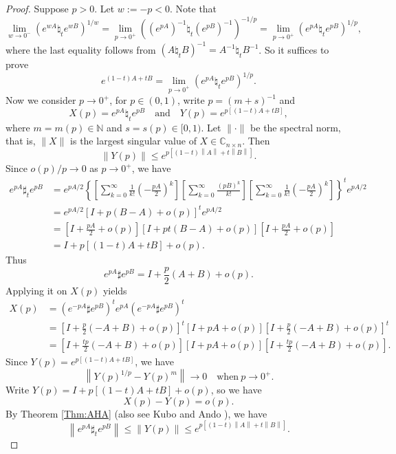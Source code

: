\documentclass[12pt, reqno]{amsart}
\numberwithin{equation}{section}
\theoremstyle{definition}
\renewcommand{\le}{\leqslant}
\newcommand\norm[1]{\left\lVert#1\right\rVert}
\def\Cnn{{\mathbb C}_{n\times n}}
\begin{document}
\begin{proof}
Suppose $p>0$. Let $w := -p<0$. Note that
\[\lim_{w \to 0^-} \left(e^{wA} \natural_t e^{wB} \right)^{1/w}
=\lim_{p \to 0^+} \left((e^{pA})^{-1} \natural_t (e^{pB})^{-1} \right)^{-1/p}
=  \lim_{p \to 0^+} \left(e^{pA} \natural_t e^{pB} \right)^{1/p},
\]
where the last equality follows from $(A\natural_t B)^{-1} = A^{-1}\natural_t B^{-1}$.
So it suffices to prove 
\[
e^{(1-t)A+tB} = \lim_{p \to 0^+} \left(e^{pA} \natural_t e^{pB}\right)^{1/p}.
\]
Now we consider $p \to 0^+$, for $p\in (0,1)$, write $p = (m+s)^{-1}$ and
\[
X(p) = e^{pA} \natural_t e^{pB} \quad \text{and} \quad Y(p) = e^{p[(1-t)A+tB]},
\]
where $m=m(p)\in \mathbb{N}$ and $s=s(p) \in [0,1)$.
Let $\|\cdot\|$ be the spectral norm, that is, $\|X\|$ is the largest singular value of $X\in \Cnn$. Then
\begin{equation}\label{norm_Y(p)}
\norm{Y(p)} \le e^{p[(1-t)\norm A+t\norm B]}.
\end{equation}
Since $o(p)/p \to 0$ as $p\to 0^+$, we have
\[
\begin{split}
e^{pA}\sharp_t e^{pB} &=  e^{pA/2}\left\{ \left[ \sum_{k=0}^{\infty} \frac{1}{k!}\left(-\frac{pA}{2}\right)^k\right]
\left[\sum_{k=0}^{\infty}\frac{(pB)^k}{k!}\right]
\left[\sum_{k=0}^{\infty}\frac{1}{k!}\left(-\frac{pA}{2}\right)^k\right]
\right\}^t e^{pA/2}\\
& = e^{pA/2}[I+p(B-A)+o(p)]^t e^{pA/2}\\
& = \left[I+\frac{pA}{2}+o(p)\right] [I+pt(B-A)+o(p)] \left[I+\frac{pA}{2}+o(p)\right]\\
& = I+p[(1-t)A+tB]+o(p).
\end{split}
\]
Thus 
\[
e^{pA}\sharp e^{pB} = I+\frac p2(A+B)+o(p).
\]
Applying it on $X(p)$ yields
\[
\begin{split}
X(p) &=  (e^{-pA}\sharp e^{pB})^t e^{pA} (e^{-pA}\sharp e^{pB})^t\\
 &=  [I+\frac p2(-A+B)+o(p)]^t
 [I+pA+o(p)] [I+\frac p2(-A+B)+o(p)]^t \\
  &=  [I+\frac {tp}2(-A+B)+o(p)]
 [I+pA+o(p)] [I+\frac {tp}2(-A+B)+o(p)].
\end{split}
\]
Since
$Y(p) =  e^{p[(1-t)A+tB]}$, we have
\begin{equation}\label{Ypm}
\norm{Y(p)^{1/p}-Y(p)^m} \to 0\quad  \text{when}\ p\to 0^+.
\end{equation}
 Write $Y(p) =  I+p[(1-t)A+tB] +o(p)$,
so we have 
\[
X(p)-Y(p) = o(p).
\]
By Theorem \ref{Thm:AHA}  (also see Kubo and Ando \cite{KA79}), we have
\[
\norm{e^{pA}\sharp_t e^{pB}} \le \|Y(p)\| \le e^{p[(1-t)\norm A+t\norm B]}.
\]
\end{proof}
\end{document}
